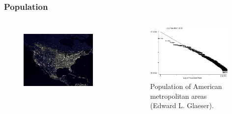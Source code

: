 \documentclass{beamer}
\begin{document}
\frame
{
  \frametitle{Population}

  \begin{columns}[c]
     \begin{figure}[h!]
     \centering
     \includegraphics[width=0.9\textwidth]{images/cities.jpg}
     \label{fig:cities}
     \end{figure}
     \begin{figure}[h!]
     \centering
     \includegraphics[width=0.95\textwidth]{images/glaeserzipf.jpg}
     \caption{Population of American metropolitan areas (Edward L. Glaeser).}
     \label{fig:glaeserzipf}
     \end{figure}
  \end{columns}
}
\end{document}
